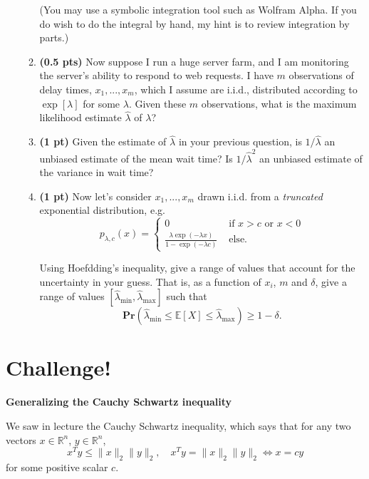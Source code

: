 \documentclass{article}
\newcommand{\R}{\mathbb R}
\newcommand{\bE}{\mathbb E}
\newcommand{\pr}{\mathbf{Pr}}
\newcommand{\showpoints}[1]{\textbf{(#1)}}
\begin{document}
\begin{enumerate}
\begin{enumerate}
(You may use a symbolic integration tool such as Wolfram Alpha. If you do wish to do the integral by hand, my hint is to review integration by parts.)



\item \showpoints{0.5 pts} Now suppose I run a huge server farm, and I am monitoring the server's ability to respond to web requests. I have $m$ observations of delay times, $x_1,...,x_m$, which I assume are i.i.d., distributed according to $\exp[\lambda]$ for some $\lambda$. 
 Given these $m$ observations,  what is the maximum likelihood estimate $\hat \lambda$ of $\lambda$?






\item \showpoints{1 pt} Given the estimate of $\hat \lambda$ in your previous question, is $1/\hat \lambda$ an unbiased estimate of the mean wait time? Is $1/\hat \lambda^2$ an unbiased estimate of the variance in wait time?



\item \showpoints{1 pt} Now let's consider $x_1,...,x_m$ drawn i.i.d. from a \emph{truncated} exponential distribution, e.g. 
\[
p_{\lambda, c}(x) = 
\begin{cases}
0 & \text{ if } x > c \text{ or } x < 0\\
\displaystyle\frac{\lambda\exp(-\lambda x)}{1-\exp(-\lambda c)} & \text{ else.}
\end{cases}
\]

Using Hoefdding's inequality, give a range of values that account for the uncertainty in your guess. That is, as a function of $x_i$, $m$ and $\delta$, give a range of values $[\hat \lambda_{\min}, \hat \lambda_{\max}]$
such that 
\[
\pr(\hat \lambda_{\min}\leq \bE[X] \leq \hat \lambda_{\max}) \geq 1-\delta.
\]


\end{enumerate}






\end{enumerate}



\newpage
\section*{Challenge!} 
\textbf{Generalizing the Cauchy Schwartz inequality}

We saw in lecture the Cauchy Schwartz inequality, which says that for any two vectors $x\in \R^n$, $y\in \R^n$, 
\[
x^Ty \leq \|x\|_2\|y\|_2, \quad x^Ty = \|x\|_2\|y\|_2 \iff x=cy
\]
for some positive scalar $c$. 
\end{document}

